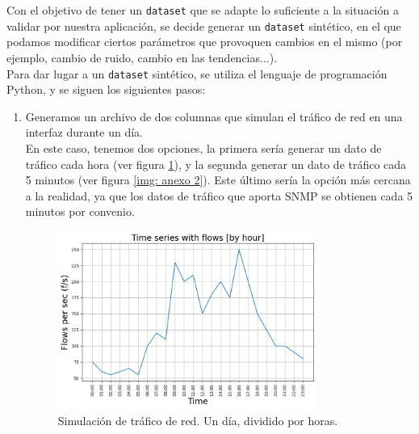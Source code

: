 \documentclass[a4paper, oneside, 12pt]{book}
\begin{document}
	\noindent Con el objetivo de tener un \texttt{dataset} que se adapte lo suficiente a la situación a validar por nuestra aplicación, se decide generar un \texttt{dataset} sintético, en el que podamos modificar ciertos parámetros que provoquen cambios en el mismo (por ejemplo, cambio de ruido, cambio en las tendencias...). \\
	
	\noindent Para dar lugar a un \texttt{dataset} sintético, se utiliza el lenguaje de programación Python, y se siguen los siguientes pasos: 
	
	\begin{enumerate}
		\item Generamos un archivo de dos columnas que simulan el tráfico de red en una interfaz durante un día. \\
		
		En este caso, tenemos dos opciones, la primera sería generar un dato de tráfico cada hora (ver figura \ref{img: anexo 1}), y la segunda generar un dato de tráfico cada 5 minutos (ver figura \ref{img: anexo 2}). Este último sería la opción más cercana a la realidad, ya que los datos de tráfico que aporta SNMP se obtienen cada 5 minutos por convenio.
		
		\begin{figure}[h!]
			\includegraphics[width=0.8\textwidth, center]{img/anexo_1.png}
			\caption{Simulación de tráfico de red. Un día, dividido por horas.}
			\label{img: anexo 1}
		\end{figure}
	
		\pagebreak
		

\end{enumerate}
\end{document}
